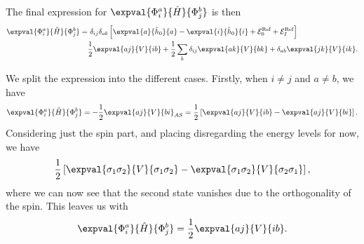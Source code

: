 The final expression for $\expval{\Phi_i^a}{\hat{H}}{\Phi_j^b}$ is then
\begin{equation}\label{eq:1p1h-1p1h}
    \begin{split}
        \expval{\Phi_i^a}{\hat{H}}{\Phi_j^b}
        =& \ \delta_{ij} \delta_{ab} \left[
            \expval{a}{\hat{h}_0}{a}
            - \expval{i}{\hat{h}_0}{i}
            + \mathcal{E}_0^{\text{Ref}}
            + \mathcal{E}_I^{\text{Ref}}
        \right] \\
        & \frac{1}{2} \expval{a j}{V}{i b}
        + \frac{1}{2} \sum_{k} \delta_{ij} \expval{a k}{V}{b k} + \delta_{ab} \expval{jk}{V}{ik}.
    \end{split}
\end{equation}

We split the expression into the different cases.
Firstly, when $i \neq j$ and $a \neq b$, we have
\begin{equation*}
    \expval{\Phi_i^a}{\hat{H}}{\Phi_j^b} = -\frac{1}{2} \expval{aj}{V}{bi}_{AS} = \frac{1}{2} \left[ \expval{aj}{V}{ib} - \expval{aj}{V}{bi} \right].
\end{equation*}
Considering just the spin part, and placing disregarding the energy levels for now, we have
\begin{equation*}
    \frac{1}{2} \left[ \expval{\sigma_1 \sigma_2}{V}{\sigma_1 \sigma_2} - \expval{\sigma_1 \sigma_2}{V}{\sigma_2 \sigma_1} \right],
\end{equation*}
where we can now see that the second state vanishes due to the orthogonality of the spin. %
This leaves us with
\begin{equation*}
    \expval{\Phi_i^a}{\hat{H}}{\Phi_j^b} = \frac{1}{2} \expval{aj}{V}{ib}.
\end{equation*}

